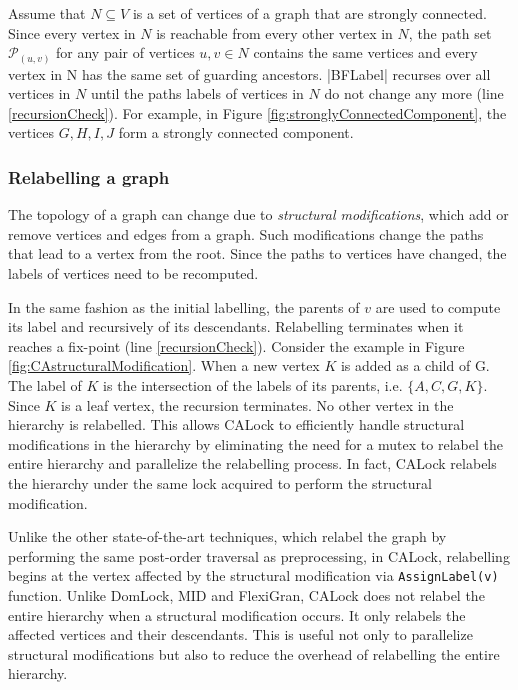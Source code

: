 Assume that $N \subseteq V$ is a set of vertices of a graph that are strongly connected. Since every vertex in $N$ is reachable from every other vertex in $N$, the path set $\mathcal{P}_{(u,v)}$ for any pair of vertices $u, v\in N$ contains the same vertices and every vertex in N has the same set of guarding ancestors. \inline|BFLabel| recurses over all vertices in $N$ until the paths labels of vertices in $N$ do not change any more (line \ref{recursionCheck}).
For example, in Figure \ref{fig:stronglyConnectedComponent}, the vertices $G, H, I, J$ form a strongly connected component. 

\subsubsection{Relabelling a graph}

The topology of a graph can change due to \emph{structural modifications}, which add or remove vertices and edges from a graph. 
Such modifications change the paths that lead to a vertex from the root.
Since the paths to vertices have changed, the labels of vertices need to be recomputed.

In the same fashion as the initial labelling, the parents of $v$ are used to compute its label and recursively of its descendants. Relabelling terminates when it reaches a fix-point (line \ref{recursionCheck}). 
Consider the example in Figure \ref{fig:CAstructuralModification}. When a new vertex $K$ is added as a child of G. The label of $K$ is the intersection of the labels of its parents, i.e. $\{A,C,G,K\}$. Since $K$ is a leaf vertex, the recursion terminates. 
No other vertex in the hierarchy is relabelled. 
This allows CALock to efficiently handle structural modifications in the hierarchy by eliminating the need for a mutex to relabel the entire hierarchy and parallelize the relabelling process. In fact, CALock relabels the hierarchy under the same lock acquired to perform the structural modification.

Unlike the other state-of-the-art techniques, which relabel the graph by performing the same post-order traversal as preprocessing, in CALock, relabelling begins at the vertex affected by the structural modification via \lstinline|AssignLabel(v)| function. 
Unlike DomLock, MID and FlexiGran, CALock does not relabel the entire hierarchy when a structural modification occurs. 
It only relabels the affected vertices and their descendants. 
This is useful not only to parallelize structural modifications but also to reduce the overhead of relabelling the entire hierarchy.

